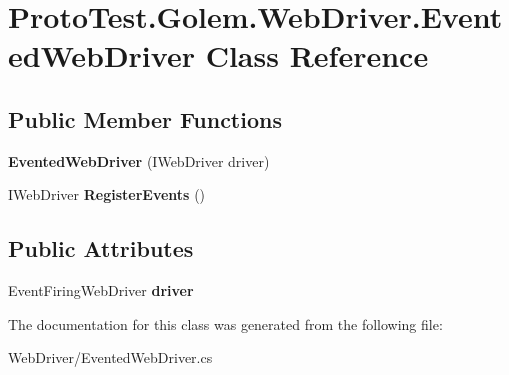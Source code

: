 \hypertarget{class_proto_test_1_1_golem_1_1_web_driver_1_1_evented_web_driver}{\section{Proto\-Test.\-Golem.\-Web\-Driver.\-Evented\-Web\-Driver Class Reference}
\label{class_proto_test_1_1_golem_1_1_web_driver_1_1_evented_web_driver}
}
\subsection*{Public Member Functions}
\begin{DoxyCompactItemize}
\item 
\hypertarget{class_proto_test_1_1_golem_1_1_web_driver_1_1_evented_web_driver_a3e06b47b472f37eff562acf49aca920c}{{\bfseries Evented\-Web\-Driver} (I\-Web\-Driver driver)}\label{class_proto_test_1_1_golem_1_1_web_driver_1_1_evented_web_driver_a3e06b47b472f37eff562acf49aca920c}

\item 
\hypertarget{class_proto_test_1_1_golem_1_1_web_driver_1_1_evented_web_driver_a43ce72e63b0adebcbb72843a0473a4cc}{I\-Web\-Driver {\bfseries Register\-Events} ()}\label{class_proto_test_1_1_golem_1_1_web_driver_1_1_evented_web_driver_a43ce72e63b0adebcbb72843a0473a4cc}

\end{DoxyCompactItemize}
\subsection*{Public Attributes}
\begin{DoxyCompactItemize}
\item 
\hypertarget{class_proto_test_1_1_golem_1_1_web_driver_1_1_evented_web_driver_ae4f45380d5f7ee99eb1313d64602ce63}{Event\-Firing\-Web\-Driver {\bfseries driver}}\label{class_proto_test_1_1_golem_1_1_web_driver_1_1_evented_web_driver_ae4f45380d5f7ee99eb1313d64602ce63}

\end{DoxyCompactItemize}


The documentation for this class was generated from the following file\-:\begin{DoxyCompactItemize}
\item 
Web\-Driver/Evented\-Web\-Driver.\-cs\end{DoxyCompactItemize}

